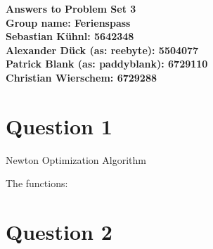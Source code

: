 \documentclass{article}
\begin{document}
\begin{center}
\LARGE \bfseries{Answers to Problem Set 3}\\
 Group name: Ferienspass\vspace{.5cm}\\
 \normalsize \normalfont
  Sebastian K\"uhnl: 5642348\\
  Alexander D\"uck (as: reebyte): 5504077\\
  Patrick Blank (as: paddyblank): 6729110\\
  Christian Wierschem: 6729288
\end{center}
\normalsize	

\section{Question 1}
Newton Optimization Algorithm
 
 The functions:
   
  
\section{Question 2}
\end{document}
